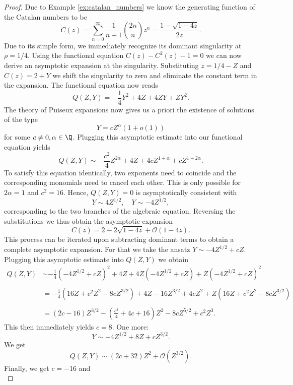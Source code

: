 \begin{proof}
  Due to Example \ref{ex:catalan_numbers} we know the generating function of the Catalan numbers to be 
  $$
    C(z) = \sum_{n = 0}^\infty \frac{1}{n+1}\binom{2n}{n}z^n = \frac{1 - \sqrt{1 - 4z}}{2z}.
  $$
  Due to its simple form, we immediately recognize its dominant singularity at $\rho = 1/4$. 
  Using the functional equation $C(z) - C^{2}(z) - 1 = 0$ we can now derive an asymptotic expansion at the singularity. Substituting $z = 1/4 - Z$ and $C(z) = 2 + Y$ we shift the singularity to zero and eliminate the constant term in the expansion. The functional equation now reads
  $$
  Q(Z,Y) = - \frac{1}{4}Y^{2} + 4Z + 4ZY + ZY^{2}.
  $$
  The theory of Puiseux expansions now gives us a priori the existence of solutions of the type 
  $$
    Y = cZ^{\alpha}(1 + o(1))
  $$ 
  for some $c \neq 0, \alpha \in \Q$. Plugging this asymptotic estimate into our functional equation yields 
  $$
    Q(Z,Y) \sim - \frac{c^{2}}{4}Z^{2\alpha} + 4Z + 4cZ^{1+\alpha} + cZ^{1+2\alpha}. 
  $$
  To satisfy this equation identically, two exponents need to coincide and the corresponding monomials need to cancel each other. This is only possible for $2\alpha = 1$ and $c^{2}= 16$. Hence, $Q(Z,Y) = 0$ is asymptotically consistent with
  $$
    Y \sim 4Z^{1/2}, \quad Y \sim -4Z^{1/2},
  $$
  corresponding to the two branches of the algebraic equation. Reversing the substitutions we thus obtain the asymptotic expansion
  $$
    C(z) = 2 - 2\sqrt{1 - 4z} + \mathcal{O}(1-4z).
  $$
  This process can be iterated upon subtracting dominant terms to obtain a complete asymptotic expansion.
  For that we take the ansatz $Y \sim -4Z^{1/2} +  cZ$. Plugging this asymptotic estimate into $Q(Z,Y)$ we obtain
  \begin{align*}
    Q(Z,Y) &\sim - \frac{1}{4}\left(-4Z^{1/2}+cZ\right)^{2} + 4Z + 4Z\left(-4Z^{1/2} + cZ\right) + Z\left(-4Z^{1/2}+cZ\right)^{2} \\\\
    &= - \frac{1}{4} \left(16Z + c^{2}Z^{2} - 8cZ^{3/2}\right) + 4Z - 16Z^{3/2}+ 4cZ^{2} + Z\left(16Z + c^{2}Z^{2} - 8cZ^{3/2}\right) \\\\
    &= (2c-16)Z^{3/2} - \left(\frac{c^{2}}{4}+4c+16\right)Z^{2}- 8cZ^{5/2}+c^2Z^{3}.
  \end{align*}
  This then immediately yields $c = 8$. One more: 
  $$
    Y \sim -4Z^{1/2} + 8Z + cZ^{3/2}.
  $$
  We get
  $$
    Q(Z,Y) \sim (2c+32)Z^{2} + \mathcal{O}\left(Z^{3/2}\right).
  $$
  Finally, we get $c = -16$ and
  $$
$$
\end{proof}
